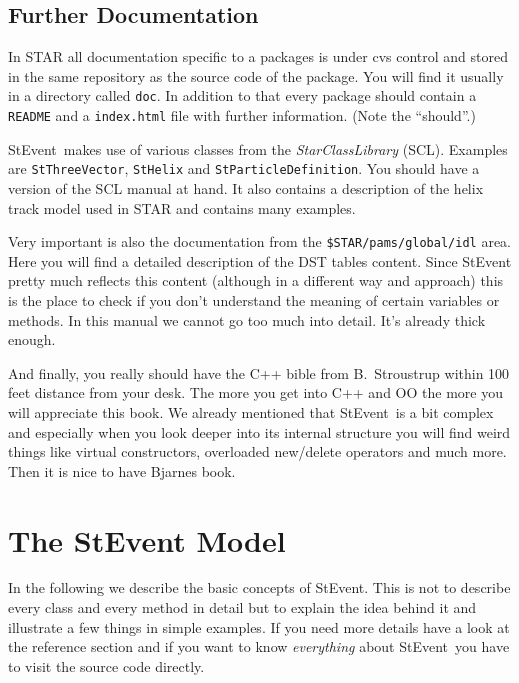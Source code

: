 \documentclass[twoside]{article}
\newcommand{\name}[1]{\textsl{#1}}%
\newcommand{\StEvent}{\textsf{StEvent}}
\begin{document}
\subsection{Further Documentation}
\label{sec:furtherDoc}

In STAR all documentation specific to a packages is under cvs control
and stored in the same repository as the source code of the package.
You will find it usually in a directory called \texttt{doc}.  In
addition to that every package should contain a \texttt{README} and a
\texttt{index.html} file with further information. (Note the
``should''.)

\StEvent\ makes use of various classes from the
\name{StarClassLibrary} (SCL).  Examples are \texttt{StThreeVector},
\texttt{StHelix} and \texttt{StParticleDefinition}. You should have a
version of the SCL manual at hand. It also contains a description of
the helix track model used in STAR and contains many
examples. 

Very important is also the documentation from the
\texttt{\$STAR/pams/global/idl} area. Here you will find a detailed
description of the DST tables content.  Since StEvent pretty much
reflects this content (although in a different way and approach) this
is the place to check if you don't understand the meaning of certain
variables or methods.  In this manual we cannot go too much into
detail. It's already thick enough.

And finally, you really should have the C++ bible from B.~Stroustrup
within 100 feet distance from your desk. The more you get into C++ and
OO the more you will appreciate this book. We already mentioned that
\StEvent\ is a bit complex and especially when you look deeper into
its internal structure you will find weird things like virtual
constructors, overloaded new/delete operators and much more.  Then it
is nice to have Bjarnes book.   \clearpage


\section{The StEvent Model} %

In the following we describe the basic concepts of \StEvent.  This is
not to describe every class and every method in detail but to explain
the idea behind it and illustrate a few things in simple examples.  If
you need more details have a look at the reference section and if you
want to know \emph{everything} about \StEvent\ you have to visit the
source code directly.
\end{document}
